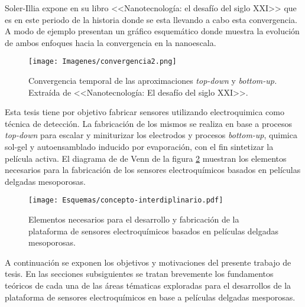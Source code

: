 	Soler-Illia expone en su libro <<Nanotecnología: el desafío del siglo XXI>>\cite{nanotecnologia-galo} que es en este periodo de la historia donde se esta llevando a cabo esta convergencia. A modo de ejemplo presentan un gráfico esquemático donde muestra la evolución de ambos enfoques hacia la convergencia en la nanoescala.

			\begin{figure}[ht!]
 			\begin{center}
 			\texttt{[image: Imagenes/convergencia2.png]}
 			\caption[Convergencia \textit{top-down }y \textit{bottom-up.}]{Convergencia temporal de las aproximaciones \textit{top-down }y \textit{bottom-up.} Extraída de <<Nanotecnología: El desafío del siglo XXI>>.}
 			\label{fig:galo-convergencia}
 		    \end{center}
 		    \end{figure}
	

    Esta tesis tiene por objetivo fabricar sensores utilizando electroquimica como técnica de detección. La fabricación de los mismos se realiza en base a procesos \textit{top-down} para escalar y miniturizar los electrodos y procesos \textit{bottom-up}, quimica sol-gel y autoensamblado inducido por evaporación, con el fin sintetizar la película activa. El diagrama de  de Venn de la figura \ref{fig:sensores} muestran los elementos necesarios para la fabricación de los sensores electroquímicos basados en películas delgadas mesoporosas. 
	
	   \begin{figure}[ht!]
 			\begin{center}
 			\texttt{[image: Esquemas/concepto-interdiplinario.pdf]}
 			\caption[Plataforma de sensores. Diagrama de Venn.]{Elementos necesarios para el desarrollo y fabricación de la plataforma de sensores electroquímicos basados en películas delgadas mesoporosas.}
 		   	\label{fig:sensores}
 		    \end{center}
 		    \end{figure}
 	
 	A continuación se exponen los objetivos y motivaciones del presente trabajo de tesis. En las secciones subsiguientes se tratan brevemente los fundamentos teóricos de cada una de las áreas tématicas exploradas para el desarrollos de la plataforma de sensores electroquímicos en base a películas delgadas mesporosas.	    

